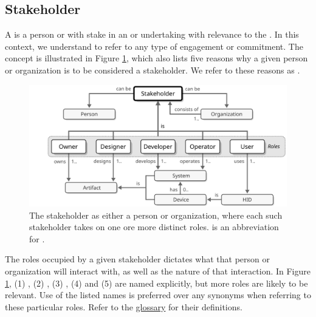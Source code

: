 \subsection{Stakeholder}
\label{sec:reference-model:stakeholder}

A  is a person or  with stake in an  or undertaking with relevance to the .
In this context, we understand  to refer to any type of engagement or commitment.
The concept is illustrated in Figure \ref{fig:stakeholder}, which also lists five reasons why a given person or organization is to be considered a stakeholder.
We refer to these reasons as .

\begin{figure}[ht!]
  \centering
  \includegraphics{figures/stakeholder}
  \caption{
    The stakeholder as either a person or organization, where each such stakeholder takes on one ore more distinct roles.
     is an abbreviation for .
  }
  \label{fig:stakeholder}
\end{figure}

The roles occupied by a given stakeholder dictates what  that person or organization will interact with, as well as the nature of that interaction.
In Figure \ref{fig:stakeholder}, (1) , (2) , (3) , (4)  and (5)  are named explicitly, but more roles are likely to be relevant.
Use of the listed names is preferred over any synonyms when referring to these particular roles.
Refer to the \hyperref[sec:glossary]{glossary} for their definitions.

